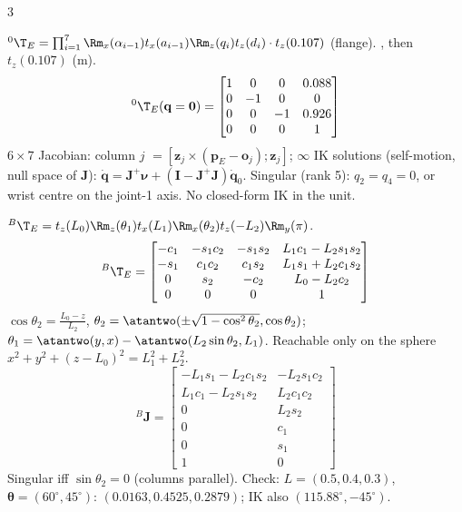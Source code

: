 \begin{multicols}{3}
\begin{fbx}
${}^0\T_E=\prod_{i=1}^{7}\Rm_x(\alpha_{i-1})t_x(a_{i-1})\Rm_z(q_i)t_z(d_i)\cdot t_z(0.107)$ (flange).
, then $t_z(0.107)$ (m).
{\rbsm\[{}^0\T_E(\mathbf q=\mathbf 0)=\begin{bmatrix}1&0&0&0.088\\0&-1&0&0\\0&0&-1&0.926\\0&0&0&1\end{bmatrix}\]}
$6\times7$ Jacobian: column $j$ $=[\mathbf z_j\times(\mathbf p_E-\mathbf o_j);\mathbf z_j]$; $\infty$ IK solutions (self-motion, null space of $\mathbf J$): $\dot{\mathbf q}=\mathbf J^+\boldsymbol\nu+(\mathbf I-\mathbf J^+\mathbf J)\dot{\mathbf q}_0$. Singular (rank 5): $q_2=q_4=0$, or wrist centre on the joint-1 axis. No closed-form IK in the unit. \chk
\end{fbx}

\begin{fbx}
${}^B\T_E=t_z(L_0)\Rm_z(\theta_1)t_x(L_1)\Rm_x(\theta_2)t_z(-L_2)\Rm_y(\pi)$.
{\rbsm\[{}^B\T_E=\begin{bmatrix}-c_1&-s_1c_2&-s_1s_2&L_1c_1-L_2s_1s_2\\-s_1&c_1c_2&c_1s_2&L_1s_1+L_2c_1s_2\\0&s_2&-c_2&L_0-L_2c_2\\0&0&0&1\end{bmatrix}\]}
$\cos\theta_2=\frac{L_0-z}{L_2}$, $\theta_2=\atantwo(\pm\sqrt{1-\cos^2\theta_2},\cos\theta_2)$; $\theta_1=\atantwo(y,x)-\atantwo(L_2\sin\theta_2,L_1)$. Reachable only on the sphere $x^2{+}y^2{+}(z{-}L_0)^2=L_1^2{+}L_2^2$.
{\rbsm\[{}^B\mathbf J=\begin{bmatrix}-L_1s_1-L_2c_1s_2&-L_2s_1c_2\\L_1c_1-L_2s_1s_2&L_2c_1c_2\\0&L_2s_2\\0&c_1\\0&s_1\\1&0\end{bmatrix}\]}
Singular iff $\sin\theta_2=0$ (columns parallel). Check: $L=(0.5,0.4,0.3)$, $\boldsymbol\theta=(60^\circ,45^\circ)$: $(0.0163,0.4525,0.2879)$; IK also $(115.88^\circ,-45^\circ)$. \chk
\end{fbx}
\end{multicols}

